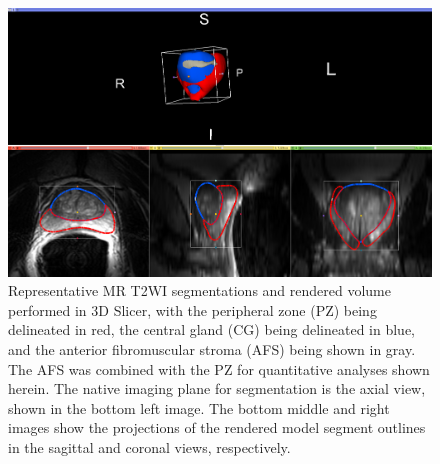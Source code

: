 \begin{figure}[htb!]
\centering
\includegraphics[width=1.0\textwidth]{tyler/MR_methods_V2.png}
\caption{Representative MR T2WI segmentations and rendered volume performed in
    3D Slicer, with the peripheral zone (PZ) being delineated in red, the
    central gland (CG) being delineated in blue, and the anterior fibromuscular
    stroma (AFS) being shown in gray.  The AFS was combined with the PZ for
    quantitative analyses shown herein.  The native imaging plane for
    segmentation is the axial view, shown in the bottom left image.  The bottom
    middle and right images show the projections of the rendered model segment
    outlines in the sagittal and coronal views, respectively.}
\label{fig:mr_segs_vol} 
\end{figure}
